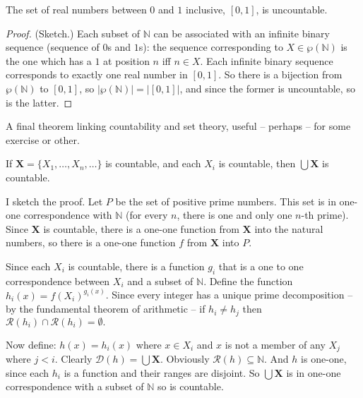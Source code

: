 \begin{theorem}
The set of real numbers between $0$ and $1$ inclusive, $[0,1]$, is uncountable. \begin{proof}
	(Sketch.) Each subset of $\mathbb{N}$ can be associated with an infinite binary sequence (sequence of $0$s and $1$s): the sequence corresponding to $X \in \wp(\mathbb{N})$ is the one which has a $1$ at position $n$ iff $n \in X$. Each infinite binary sequence corresponds to exactly one real number in $[0,1]$. So there is a bijection from $\wp(\mathbb{N})$ to $[0,1]$, so $|\wp(\mathbb{N})| = |[0,1]|$, and since the former is uncountable, so is the latter.
\end{proof}
\end{theorem}


A final theorem linking countability and set theory, useful – perhaps – for some exercise or other.
\begin{theorem}\label{countu}
	If $\mathbf{X} = \{X_{1},\ldots,X_{n},\ldots\}$ is countable, and each $X_{i}$ is countable, then $\bigcup \mathbf{X}$ is countable.
\end{theorem}
I sketch the proof.
Let $P$ be the set of positive prime numbers. This set is in one-one correspondence with $\mathbb{N}$ (for every $n$, there is one and only one $n$-th prime). Since $\mathbf{X}$ is countable, there is a one-one function from $\mathbf{X}$ into the natural numbers, so there is a one-one function $f$ from $\mathbf{X}$ into $P$.

Since each $X_{i}$ is countable, there is a function $g_{i}$ that is a one to one correspondence between $X_{i}$ and a subset of $\mathbb{N}$. Define the function $h_{i}(x) = f(X_{i})^{g_{i}(x)}$. Since every integer has a unique prime decomposition – by the fundamental theorem of arithmetic \citep[§V.14]{fundta} – if $h_{i}\neq h_{j}$ then $\mathcal{R}(h_{i})\cap\mathcal{R}(h_{i})=\emptyset.$

Now define: $h(x) = h_i(x)$ where $x\in X_i$ and $x$ is not a member of any $X_{j}$ where $j < i$. Clearly $\mathcal{D}(h) = \bigcup\mathbf{X}$. Obviously $\mathcal{R}(h) \subseteq \mathbb{N}$. And $h$ is one-one, since each $h_{i}$ is a function and their ranges are disjoint. So $\bigcup\mathbf{X}$ is in one-one correspondence with a subset of $\mathbb{N}$ so is countable. 


